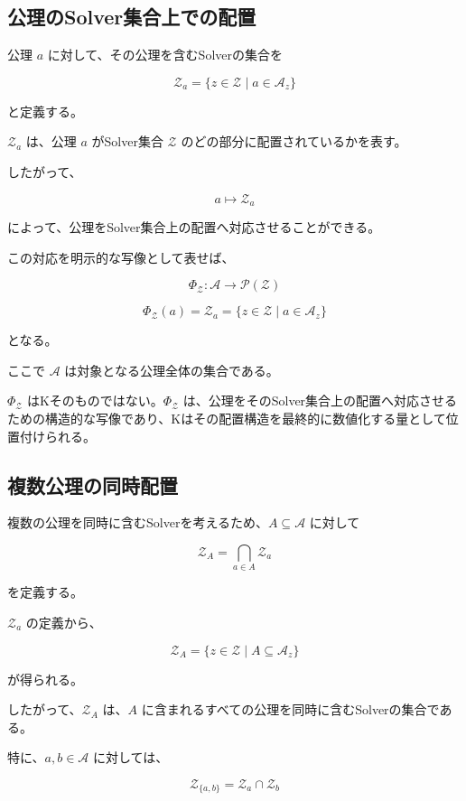 \subsection{公理のSolver集合上での配置}

公理 $a$ に対して、その公理を含むSolverの集合を

\[
\mathcal{Z}_a = \{z\in\mathcal{Z}\mid a\in\mathcal{A}_z\}
\]

と定義する。

$\mathcal{Z}_a$ は、公理 $a$ がSolver集合 $\mathcal{Z}$ のどの部分に配置されているかを表す。

したがって、

\[
a
\longmapsto
\mathcal{Z}_a
\]

によって、公理をSolver集合上の配置へ対応させることができる。

この対応を明示的な写像として表せば、

\[
\Phi_{\mathcal{Z}}:\mathcal{A}\longrightarrow\mathcal{P}(\mathcal{Z})
\]

\[
\Phi_{\mathcal{Z}}(a) = \mathcal{Z}_a = \{z\in\mathcal{Z}\mid a\in\mathcal{A}_z\}
\]

となる。

ここで $\mathcal{A}$ は対象となる公理全体の集合である。

$\Phi_{\mathcal{Z}}$ はKそのものではない。$\Phi_{\mathcal{Z}}$ は、公理をそのSolver集合上の配置へ対応させるための構造的な写像であり、Kはその配置構造を最終的に数値化する量として位置付けられる。

\subsection{複数公理の同時配置}

複数の公理を同時に含むSolverを考えるため、$A\subseteq\mathcal{A}$ に対して

\[
\mathcal{Z}_A = \bigcap_{a\in A}\mathcal{Z}_a
\]

を定義する。

$\mathcal{Z}_a$ の定義から、

\[
\mathcal{Z}_A =\{z\in\mathcal{Z}\mid A\subseteq\mathcal{A}_z\}
\]

が得られる。

したがって、$\mathcal{Z}_A$ は、$A$ に含まれるすべての公理を同時に含むSolverの集合である。

特に、$a,b\in\mathcal{A}$ に対しては、

\[
\mathcal{Z}_{\{a,b\}} = \mathcal{Z}_a\cap\mathcal{Z}_b
\]

